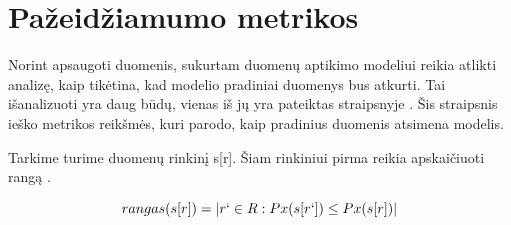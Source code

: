 \documentclass{VUMIFInfBakalaurinis}
\begin{document}




	




















\section{Pažeidžiamumo metrikos}

\par Norint apsaugoti duomenis, sukurtam duomenų aptikimo modeliui reikia atlikti analizę, kaip tikėtina, kad modelio pradiniai duomenys bus atkurti. Tai išanalizuoti yra daug būdų, vienas iš jų yra pateiktas straipsnyje \cite{9}.
 Šis straipsnis ieško metrikos reikšmės, kuri parodo, kaip pradinius duomenis atsimena modelis.
\par Tarkime turime duomenų rinkinį s[r]. Šiam rinkiniui pirma reikia apskaičiuoti rangą \cite{8}.

\begin{equation}
rangas(s[r]) = | {r` \in R : Px(s[r`]) \leq Px(s[r])} |
\label{eq:Lygtis 1.}
\end{equation}
\end{document}
